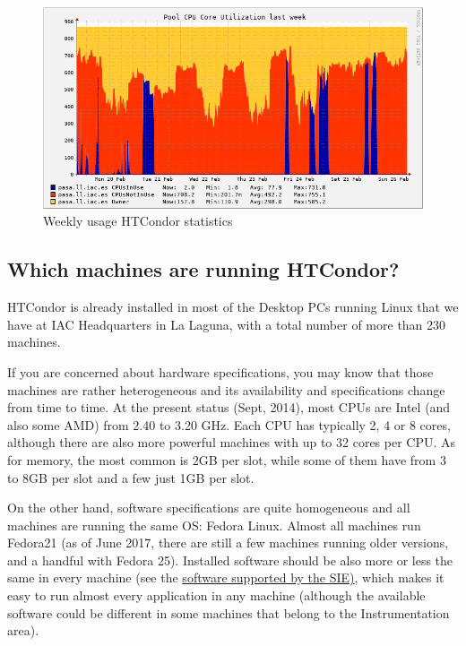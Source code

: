 \documentclass[a4paper,10pt]{article}
\begin{document}
\begin{figure}[htbp]
\centering
\includegraphics[width=.9\linewidth]{images/introduction/weekly_usage.png}
\caption{\label{fig:org89f1541}
Weekly usage HTCondor statistics}
\end{figure}


\subsection{Which machines are running HTCondor?}
\label{sec:org6b4ac16}

HTCondor is already installed in most of the Desktop PCs running Linux that we
have at IAC Headquarters in La Laguna, with a total number of more than 230
machines.

If you are concerned about hardware specifications, you may know that those
machines are rather heterogeneous and its availability and specifications change
from time to time. At the present status (Sept, 2014), most CPUs are Intel (and
also some AMD) from 2.40 to 3.20 GHz. Each CPU has typically 2, 4 or 8 cores,
although there are also more powerful machines with up to 32 cores per CPU. As
for memory, the most common is 2GB per slot, while some of them have from 3 to
8GB per slot and a few just 1GB per slot.

On the other hand, software specifications are quite homogeneous and all
machines are running the same OS: Fedora Linux. Almost all machines run Fedora21
(as of June 2017, there are still a few machines running older versions, and a
handful with Fedora 25). Installed software should be also more or less the same
in every machine (see the \href{http://research.iac.es/sieinvens/SINFIN/Main/software\_sinfin.php}{software supported by the SIE)}, which makes
it easy to run almost every application in any machine (although the available
software could be different in some machines that belong to the Instrumentation
area).
\end{document}
